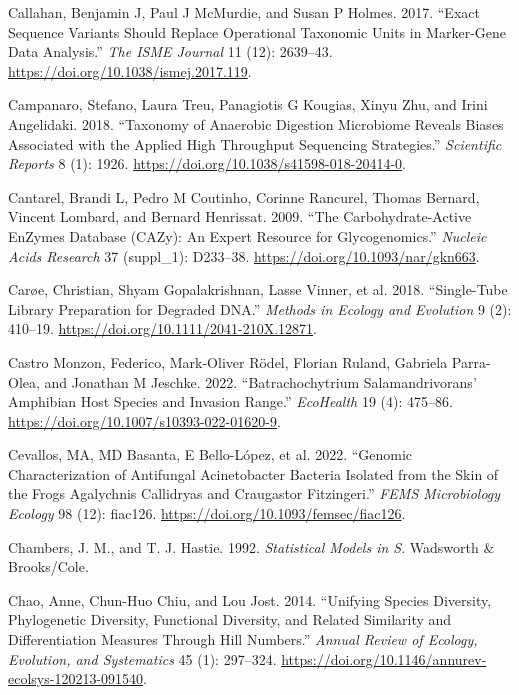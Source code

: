 \documentclass[
  12pt,
]{article}
\newlength{\cslhangindent}
\newenvironment{CSLReferences}[2] %
 {\begin{list}{}{%
  \setlength{\itemindent}{0pt}
  \setlength{\leftmargin}{0pt}
  \setlength{\parsep}{0pt}
  \ifodd #1
   \setlength{\leftmargin}{\cslhangindent}
   \setlength{\itemindent}{-1\cslhangindent}
  \fi
  \setlength{\itemsep}{#2\baselineskip}}}
 {\end{list}}
\begin{document}
\begin{CSLReferences}{1}{1}
Callahan, Benjamin J, Paul J McMurdie, and Susan P Holmes. 2017.
{``Exact Sequence Variants Should Replace Operational Taxonomic Units in
Marker-Gene Data Analysis.''} \emph{The ISME Journal} 11 (12): 2639--43.
\url{https://doi.org/10.1038/ismej.2017.119}.

Campanaro, Stefano, Laura Treu, Panagiotis G Kougias, Xinyu Zhu, and
Irini Angelidaki. 2018. {``Taxonomy of Anaerobic Digestion Microbiome
Reveals Biases Associated with the Applied High Throughput Sequencing
Strategies.''} \emph{Scientific Reports} 8 (1): 1926.
\url{https://doi.org/10.1038/s41598-018-20414-0}.

Cantarel, Brandi L, Pedro M Coutinho, Corinne Rancurel, Thomas Bernard,
Vincent Lombard, and Bernard Henrissat. 2009. {``The
{Carbohydrate}-{Active} {EnZymes} Database ({CAZy}): An Expert Resource
for Glycogenomics.''} \emph{Nucleic Acids Research} 37 (suppl\_1):
D233--38. \url{https://doi.org/10.1093/nar/gkn663}.

Carøe, Christian, Shyam Gopalakrishnan, Lasse Vinner, et al. 2018.
{``Single-Tube Library Preparation for Degraded {DNA}.''} \emph{Methods
in Ecology and Evolution} 9 (2): 410--19.
\url{https://doi.org/10.1111/2041-210X.12871}.

Castro Monzon, Federico, Mark-Oliver Rödel, Florian Ruland, Gabriela
Parra-Olea, and Jonathan M Jeschke. 2022. {``Batrachochytrium
Salamandrivorans' Amphibian Host Species and Invasion Range.''}
\emph{EcoHealth} 19 (4): 475--86.
\url{https://doi.org/10.1007/s10393-022-01620-9}.

Cevallos, MA, MD Basanta, E Bello-López, et al. 2022. {``Genomic
Characterization of Antifungal {Acinetobacter} Bacteria Isolated from
the Skin of the Frogs {Agalychnis} Callidryas and {Craugastor}
Fitzingeri.''} \emph{FEMS Microbiology Ecology} 98 (12): fiac126.
\url{https://doi.org/10.1093/femsec/fiac126}.

Chambers, J. M., and T. J. Hastie. 1992. \emph{Statistical {Models} in
{S}}. Wadsworth \& Brooks/Cole.

Chao, Anne, Chun-Huo Chiu, and Lou Jost. 2014. {``Unifying Species
Diversity, Phylogenetic Diversity, Functional Diversity, and Related
Similarity and Differentiation Measures Through {Hill} Numbers.''}
\emph{Annual Review of Ecology, Evolution, and Systematics} 45 (1):
297--324. \url{https://doi.org/10.1146/annurev-ecolsys-120213-091540}.


\end{CSLReferences}
\end{document}
